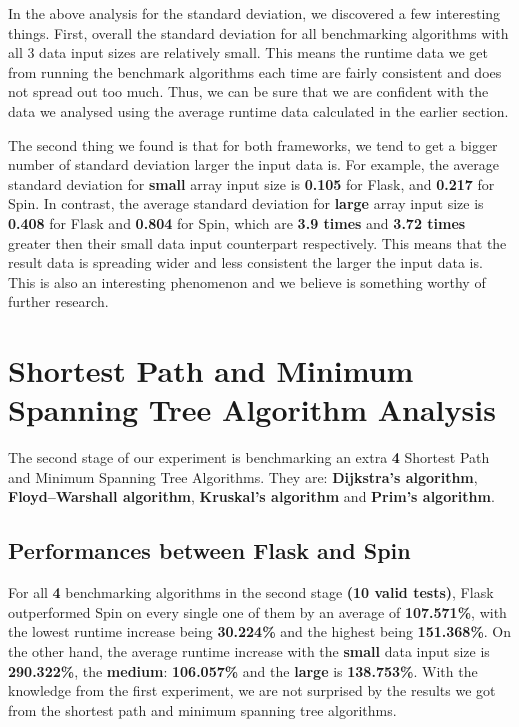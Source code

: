 In the above analysis for the standard deviation, we discovered a few interesting things. First, overall the standard deviation for all benchmarking algorithms with all 3 data input sizes are relatively small. This means the runtime data we get from running the benchmark algorithms each time are fairly consistent and does not spread out too much. Thus, we can be sure that we are confident with the data we analysed using the average runtime data calculated in the earlier section.

The second thing we found is that for both frameworks, we tend to get a bigger number of standard deviation larger the input data is. For example, the average standard deviation for \textbf{small} array input size is \textbf{0.105} for Flask, and \textbf{0.217} for Spin. In contrast, the average standard deviation for \textbf{large} array input size is \textbf{0.408} for Flask and \textbf{0.804} for Spin, which are \textbf{3.9 times} and \textbf{3.72 times} greater then their small data input counterpart respectively. This means that the result data is spreading wider and less consistent the larger the input data is. This is also an interesting phenomenon and we believe is something worthy of further research.

\bigskip
\section{Shortest Path and Minimum Spanning Tree Algorithm Analysis}

The second stage of our experiment is benchmarking an extra \textbf{4} Shortest Path and Minimum Spanning Tree Algorithms. They are: \textbf{Dijkstra’s algorithm}, \textbf{Floyd–Warshall algorithm}, \textbf{Kruskal’s algorithm} and \textbf{Prim’s algorithm}.

\subsection{Performances between Flask and Spin}

For all \textbf{4} benchmarking algorithms in the second stage \textbf{(10 valid tests)}, Flask outperformed Spin on every single one of them by an average of \textbf{107.571\%}, with the lowest runtime increase being \textbf{30.224\%} and the highest being \textbf{151.368\%}. On the other hand, the average runtime increase with the \textbf{small} data input size is \textbf{290.322\%}, the \textbf{medium}: \textbf{106.057\%} and the \textbf{large} is \textbf{138.753\%}. With the knowledge from the first experiment, we are not surprised by the results we got from the shortest path and minimum spanning tree algorithms.


